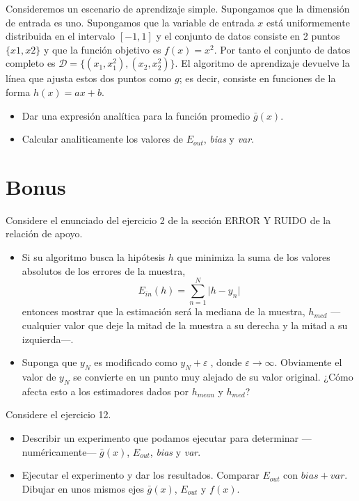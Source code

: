 \documentclass[a4paper, 11pt]{article}
\begin{document}
    \begin{ejercicio}
        Consideremos un escenario de aprendizaje simple. Supongamos que la dimensión de entrada es uno. Supongamos que la variable de entrada $x$ está uniformemente distribuida en el intervalo $[−1, 1]$ y el conjunto de datos consiste en 2 puntos $\{x1, x2\}$ y que la función objetivo es $f(x) = x^2$. Por tanto el conjunto de datos completo es $\mathcal{D} = \{(x_1 , x_1^2), (x_2, x_2^2)\}$. El algoritmo de aprendizaje devuelve la línea que ajusta estos dos puntos como $g$; es decir,  consiste en funciones de la forma $h(x) = ax + b$.
        \begin{itemize}
            \item Dar una expresión analítica para la función promedio $\bar{g}(x)$.
            \item Calcular analiticamente los valores de $E_{out}$, \emph{bias} y \emph{var}.
        \end{itemize}
    \end{ejercicio}


    \section{Bonus}

    \begin{bonus}
        Considere el enunciado del ejercicio 2 de la sección ERROR Y RUIDO de la relación de apoyo.
        \begin{itemize}
            \item Si su algoritmo busca la hipótesis $h$ que minimiza la suma de los valores absolutos de los errores de la muestra,
            \[
            E_{in}(h) = \sum_{n=1}^N \vert h - y_n \vert
            \]
            entonces mostrar que la estimación será la mediana de la muestra, $h_{med}$ ---cualquier valor que deje la mitad de la muestra a su derecha y la mitad a su izquierda---.
            \item Suponga que $y_N$ es modificado como $y_N + \varepsilon$, donde $\varepsilon \to \infty$. Obviamente el valor de $y_N$ se convierte en un punto muy alejado de su valor original. ¿Cómo afecta esto a los estimadores dados por $h_{mean}$ y $h_{med}$?
        \end{itemize}
    \end{bonus}



    \begin{bonus}
        Considere el ejercicio 12.
        \begin{itemize}
            \item Describir un experimento que podamos ejecutar para determinar ---numéricamente--- $\bar{g}(x)$, $E_{out}$, \emph{bias} y \emph{var}.
            \item Ejecutar el experimento y dar los resultados. Comparar $E_{out}$ con $bias+var$. Dibujar en unos mismos ejes $\bar{g}(x)$, $E_{out}$ y $f(x)$.
        \end{itemize}
    \end{bonus}
\end{document}
